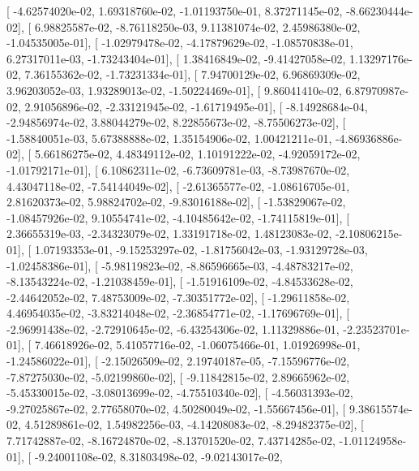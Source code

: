\documentclass{article}
\begin{document}
       [ -4.62574020e-02,   1.69318760e-02,  -1.01193750e-01,
          8.37271145e-02,  -8.66230444e-02],
       [  6.98825587e-02,  -8.76118250e-03,   9.11381074e-02,
          2.45986380e-02,  -1.04535005e-01],
       [ -1.02979478e-02,  -4.17879629e-02,  -1.08570838e-01,
          6.27317011e-03,  -1.73243404e-01],
       [  1.38416849e-02,  -9.41427058e-02,   1.13297176e-02,
          7.36155362e-02,  -1.73231334e-01],
       [  7.94700129e-02,   6.96869309e-02,   3.96203052e-03,
          1.93289013e-02,  -1.50224469e-01],
       [  9.86041410e-02,   6.87970987e-02,   2.91056896e-02,
         -2.33121945e-02,  -1.61719495e-01],
       [ -8.14928684e-04,  -2.94856974e-02,   3.88044279e-02,
          8.22855673e-02,  -8.75506273e-02],
       [ -1.58840051e-03,   5.67388888e-02,   1.35154906e-02,
          1.00421211e-01,  -4.86936886e-02],
       [  5.66186275e-02,   4.48349112e-02,   1.10191222e-02,
         -4.92059172e-02,  -1.01792171e-01],
       [  6.10862311e-02,  -6.73609781e-03,  -8.73987670e-02,
          4.43047118e-02,  -7.54144049e-02],
       [ -2.61365577e-02,  -1.08616705e-01,   2.81620373e-02,
          5.98824702e-02,  -9.83016188e-02],
       [ -1.53829067e-02,  -1.08457926e-02,   9.10554741e-02,
         -4.10485642e-02,  -1.74115819e-01],
       [  2.36655319e-03,  -2.34323079e-02,   1.33191718e-02,
          1.48123083e-02,  -2.10806215e-01],
       [  1.07193353e-01,  -9.15253297e-02,  -1.81756042e-03,
         -1.93129728e-03,  -1.02458386e-01],
       [ -5.98119823e-02,  -8.86596665e-03,  -4.48783217e-02,
         -8.13543224e-02,  -1.21038459e-01],
       [ -1.51916109e-02,  -4.84533628e-02,  -2.44642052e-02,
          7.48753009e-02,  -7.30351772e-02],
       [ -1.29611858e-02,   4.46954035e-02,  -3.83214048e-02,
         -2.36854771e-02,  -1.17696769e-01],
       [ -2.96991438e-02,  -2.72910645e-02,  -6.43254306e-02,
          1.11329886e-01,  -2.23523701e-01],
       [  7.46618926e-02,   5.41057716e-02,  -1.06075466e-01,
          1.01926998e-01,  -1.24586022e-01],
       [ -2.15026509e-02,   2.19740187e-05,  -7.15596776e-02,
         -7.87275030e-02,  -5.02199860e-02],
       [ -9.11842815e-02,   2.89665962e-02,  -5.45330015e-02,
         -3.08013699e-02,  -4.75510340e-02],
       [ -4.56031393e-02,  -9.27025867e-02,   2.77658070e-02,
          4.50280049e-02,  -1.55667456e-01],
       [  9.38615574e-02,   4.51289861e-02,   1.54982256e-03,
         -4.14208083e-02,  -8.29482375e-02],
       [  7.71742887e-02,  -8.16724870e-02,  -8.13701520e-02,
          7.43714285e-02,  -1.01124958e-01],
       [ -9.24001108e-02,   8.31803498e-02,  -9.02143017e-02,
\end{document}
